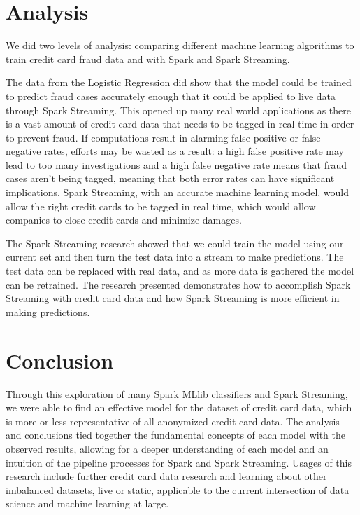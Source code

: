 \documentclass[9pt,twocolumn,twoside]{idsi}
\begin{document}
\section{Analysis}
We did two levels of analysis: comparing different machine learning algorithms to train credit card fraud data and with Spark and Spark Streaming. 

The data from the Logistic Regression did show that the model could be trained to predict fraud cases accurately enough that it could be applied to live data through Spark Streaming. This opened up many real world applications as there is a vast amount of credit card data that needs to be tagged in real time in order to prevent fraud. If computations result in alarming false positive or false negative rates, efforts may be wasted as a result: a high false positive rate may lead to too many investigations and a high false negative rate means that fraud cases aren't being tagged, meaning that both error rates can have significant implications. Spark Streaming, with an accurate machine learning model, would allow the right credit cards to be tagged in real time, which would allow companies to close credit cards and minimize damages. 

The Spark Streaming research showed that we could train the model using our current set and then turn the test data into a stream to make predictions. The test data can be replaced with real data, and as more data is gathered the model can be retrained. The research presented demonstrates how to accomplish Spark Streaming with credit card data and how Spark Streaming is more efficient in making predictions. 


\section{Conclusion}

Through this exploration of many Spark MLlib classifiers and Spark Streaming, we were able to find an effective model for the dataset of credit card data, which is more or less representative of all anonymized credit card data. The analysis and conclusions tied together the fundamental concepts of each model with the observed results, allowing for a deeper understanding of each model and an intuition of the pipeline processes for Spark and Spark Streaming. Usages of this research include further credit card data research and learning about other imbalanced datasets, live or static, applicable to the current intersection of data science and machine learning at large. 
\end{document}
